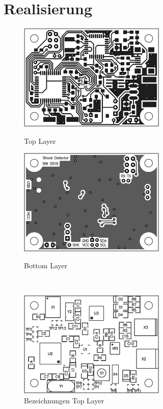 \chapter{Realisierung}

\newpage
\begin{figure}[H]
	\begin{minipage}[hbt]{7cm}
		\centering
		\includegraphics[width=7cm,]{img/HW/top.png}
		\caption{Top Layer}
		\label{fig:TopBot}
	\end{minipage}
	\hfill
	\begin{minipage}[hbt]{7cm}
		\centering
		\includegraphics[width=7cm]{img/HW/bottom.png}
		\caption{Bottom Layer}
		\label{fig:TopBez}
	\end{minipage}
	\\[4ex]
	\begin{minipage}[hbt]{7cm}
		\centering
		\includegraphics[width=7cm]{img/HW/designator.png}
		\caption{Bezeichnungen Top Layer}
		\label{fig:BotBez}
	\end{minipage}
	\hfill

\end{figure}
